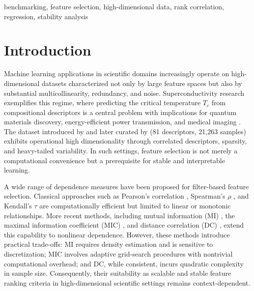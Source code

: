 \documentclass[twoside,11pt]{article}
\begin{document}
\begin{keywords}
benchmarking, feature selection, high-dimensional data, rank correlation,
regression, stability analysis
\end{keywords}

\section{Introduction}
Machine learning applications in scientific domains increasingly operate on
high-dimensional datasets characterized not only by large feature spaces but
also by substantial multicollinearity, redundancy, and noise. Superconductivity
research exemplifies this regime, where predicting the critical temperature
$T_c$ from compositional descriptors is a central problem with implications for
quantum materials discovery, energy-efficient power transmission, and medical
imaging \citep{Stanev2018machine}. The dataset introduced by
\citet{Hamidieh2018data} and later curated by \citet{Matasov2020vis}
(81 descriptors, 21,263 samples) exhibits operational high dimensionality through
correlated descriptors, sparsity, and heavy-tailed variability. In such settings,
feature selection is not merely a computational convenience but a prerequisite
for stable and interpretable learning.

A wide range of dependence measures have been proposed for filter-based feature
selection. Classical approaches such as Pearson's correlation \citep{Pearson1900},
Spearman's $\rho$ \citep{Spearman1904}, and Kendall's $\tau$ \citep{Kendall1938}
are computationally efficient but limited to linear or monotonic relationships.
More recent methods, including mutual information (MI) \citep{Ross2014mutual},
the maximal information coefficient (MIC) \citep{Reshef2011}, and distance
correlation (DC) \citep{Szekely2007}, extend this capability to nonlinear
dependence. However, these methods introduce practical trade-offs: MI requires
density estimation and is sensitive to discretization; MIC involves adaptive
grid-search procedures with nontrivial computational overhead; and DC, while
consistent, incurs quadratic complexity in sample size. Consequently, their
suitability as scalable and stable feature ranking criteria in high-dimensional
scientific settings remains context-dependent.
\end{document}
